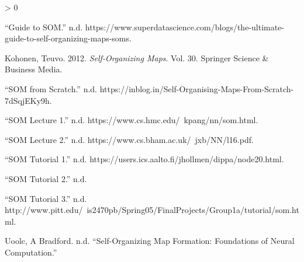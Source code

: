 \documentclass[
]{article}
\newlength{\cslhangindent}
\newenvironment{CSLReferences}[2] %
 {%
  \setlength{\parindent}{0pt}
  \ifodd #1 \everypar{\setlength{\hangindent}{\cslhangindent}}\ignorespaces\fi
  \ifnum #2 > 0
  \setlength{\parskip}{#2\baselineskip}
  \fi
 }%
 {}
\begin{document}
\hypertarget{refs}{}
\begin{CSLReferences}{1}{0}
\leavevmode\hypertarget{ref-a3}{}%
{``Guide to SOM.''} n.d.
https://www.superdatascience.com/blogs/the-ultimate-guide-to-self-organizing-maps-soms.

\leavevmode\hypertarget{ref-a2}{}%
Kohonen, Teuvo. 2012. \emph{Self-Organizing Maps}. Vol. 30. Springer
Science \& Business Media.

\leavevmode\hypertarget{ref-a9}{}%
{``SOM from Scratch.''} n.d.
https://inblog.in/Self-Organising-Maps-From-Scratch-7dSqjEKy9h.

\leavevmode\hypertarget{ref-a4}{}%
{``SOM Lecture 1.''} n.d. https://www.cs.hmc.edu/~kpang/nn/som.html.

\leavevmode\hypertarget{ref-a7}{}%
{``SOM Lecture 2.''} n.d. https://www.cs.bham.ac.uk/~jxb/NN/l16.pdf.

\leavevmode\hypertarget{ref-a5}{}%
{``SOM Tutorial 1.''} n.d.
https://users.ics.aalto.fi/jhollmen/dippa/node20.html.

\leavevmode\hypertarget{ref-a6}{}%
{``SOM Tutorial 2.''} n.d.

\leavevmode\hypertarget{ref-a8}{}%
{``SOM Tutorial 3.''} n.d.
http://www.pitt.edu/~is2470pb/Spring05/FinalProjects/Group1a/tutorial/som.html.

\leavevmode\hypertarget{ref-a1}{}%
Uoolc, A Bradford. n.d. {``Self-Organizing Map Formation: Foundations of
Neural Computation.''}

\end{CSLReferences}
\end{document}
